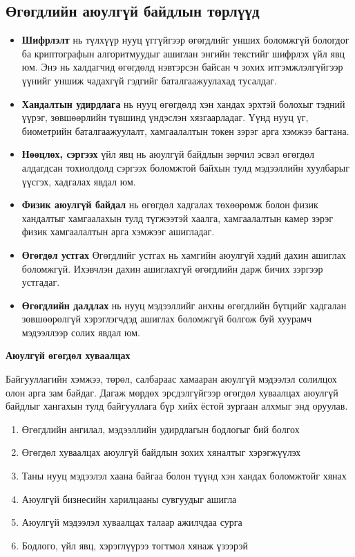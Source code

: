 \subsection{Өгөгдлийн аюулгүй байдлын төрлүүд}
\begin{itemize}
    \item \textbf{Шифрлэлт} нь түлхүүр нууц үггүйгээр өгөгдлийг унших боломжгүй бологдог ба криптографын алгоритмуудыг ашиглан энгийн текстийг шифрлэх үйл явц юм. Энэ нь халдагчид өгөгдөлд нэвтэрсэн байсан ч зохих итгэмжлэлгүйгээр үүнийг уншиж чадахгүй гэдгийг баталгаажуулахад тусалдаг.
    \item \textbf{Хандалтын удирдлага} нь нууц өгөгдөлд хэн хандах эрхтэй болохыг тэдний үүрэг, зөвшөөрлийн түвшинд үндэслэн хязгаарладаг. Үүнд нууц үг, биометрийн баталгаажуулалт, хамгаалалтын токен зэрэг арга хэмжээ багтана.
    \item \textbf{Нөөцлөх, сэргээх} үйл явц нь аюулгүй байдлын зөрчил эсвэл өгөгдөл алдагдсан тохиолдолд сэргээх боломжтой байхын тулд мэдээллийн хуулбарыг үүсгэх, хадгалах явдал юм.
    \item \textbf{Физик аюулгүй байдал} нь өгөгдөл хадгалах төхөөрөмж болон физик хандалтыг хамгаалахын тулд түгжээтэй хаалга, хамгаалалтын камер зэрэг физик хамгаалалтын арга хэмжээг ашигладаг.
    \item \textbf{Өгөгдөл устгах} Өгөгдлийг устгах нь хамгийн аюулгүй хэдий дахин ашиглах боломжгүй. Ихэвчлэн дахин ашиглахгүй өгөгдлийн дарж бичих зэргээр устгадаг.
    \item \textbf{Өгөгдлийн далдлах} нь нууц мэдээллийг анхны өгөгдлийн бүтцийг хадгалан зөвшөөрөлгүй хэрэглэгчдэд ашиглах боломжгүй болгож буй хуурамч мэдээллээр солих явдал юм.
\end{itemize}

\textbf{Аюулгүй өгөгдөл хуваалцах}

Байгууллагийн хэмжээ, төрөл, салбараас хамааран аюулгүй мэдээлэл солилцох олон арга зам байдаг. Дагаж мөрдөх эрсдэлгүйгээр өгөгдөл хуваалцах аюулгүй байдлыг хангахын тулд байгууллага бүр хийх ёстой зургаан алхмыг энд оруулав.

\begin{enumerate}
    \item Өгөгдлийн ангилал, мэдээллийн удирдлагын бодлогыг бий болгох
    \item Өгөгдөл хуваалцах аюулгүй байдлын зохих хяналтыг хэрэгжүүлэх
    \item Таны нууц мэдээлэл хаана байгаа болон түүнд хэн хандах боломжтойг хянах
    \item Аюулгүй бизнесийн харилцааны сувгуудыг ашигла
    \item Аюулгүй мэдээлэл хуваалцах талаар ажилчдаа сурга
    \item Бодлого, үйл явц, хэрэглүүрээ тогтмол хянаж үзээрэй
\end{enumerate}

